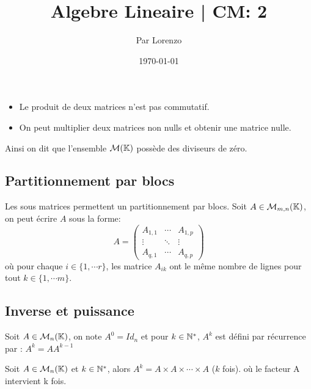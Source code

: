 \documentclass[a4paper, 12pt]{article}
\title{Algebre Lineaire | CM: 2}
\author{Par Lorenzo}
\date{\today}
\begin{document}
\maketitle


\begin{remark}
    \begin{itemize}.
        \item Le produit de deux matrices n'est pas commutatif.
        \item On peut multiplier deux matrices non nulls et obtenir une matrice nulle.
    \end{itemize}
    Ainsi on dit que l'ensemble $\mathcal{M}(\mathbb{K})$ possède des diviseurs de zéro.
\end{remark}

\subsection{Partitionnement par blocs}

\begin{definition}
    Les sous matrices permettent un partitionnement par blocs.
    Soit $A \in \mathcal{M}_{m,n}(\mathbb{K})$, on peut écrire $A$ sous la forme:
    $$
    A = \left(
    \begin{array}{c|c|c}
        A_{1,1} & \cdots & A_{1,p} \\
        \hline
        \vdots & \ddots & \vdots \\
        \hline
        A_{q,1} & \cdots & A_{q,p}
    \end{array}
    \right)
    $$
    où pour chaque $i \in \{1, \cdots r\}$, les matrice $A_{ik}$ ont le même nombre de lignes pour tout $k \in \{1, \cdots m\}$.
\end{definition}

\subsection{Inverse et puissance}

\begin{definition}
    Soit $A \in \mathcal{M}_n(\mathbb{K})$, on note $A^0 = Id_n$ et pour $k \in \mathbb{N}^*$, $A^k$ est défini par récurrence par : $A^k = AA^{k-1}$
\end{definition}

\begin{proprietes}
    Soit $A \in \mathcal{M}_n(\mathbb{K})$ et $k \in \mathbb{N}^*$, alors $A^k = A \times A \times \cdots \times A$ ($k$ fois). où le facteur A intervient k fois.
\end{proprietes}
\end{document}
